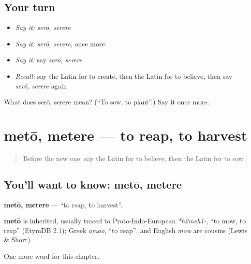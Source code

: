 \subsection*{Your turn}
\begin{itemize}
\raggedright
  \item \emph{Say it:} \emph{serō, serere}
  \item \emph{Say it:} \emph{serō, serere}, once more
  \item \emph{Say it:} say \emph{serō, serere}
  \item \emph{Recall:} say the Latin for to create, then the Latin for to believe, then say \emph{serō, serere} again
\end{itemize}

\begin{tcolorbox}[breakable,colback=teal!4,colframe=teal!35!black,title={Before you move on}]
What does serō, serere mean? (\textquotedblleft{}To sow, to plant\textquotedblright{}.) Say it once more.
\end{tcolorbox}
\section[metō, metere]{metō, metere — to reap, to harvest}

\label{lesson:LA-C172-meto}



\begin{quote}
Before the new one: say the Latin for to believe, then the Latin for to sow.
\end{quote}

\subsection*{You'll want to know: metō, metere}
\textbf{metō, metere} — \textquotedblleft{}to reap, to harvest\textquotedblright{}.

\begin{cousinweb}
\textbf{metō} is inherited, usually traced to Proto-Indo-European \emph{*h2meh1-}, \textquotedblleft{}to mow, to reap\textquotedblright{} (EtymDB 2.1); Greek \emph{amaō}, \textquotedblleft{}to reap\textquotedblright{}, and English \emph{mow} are cousins (Lewis \& Short).
\end{cousinweb}

\begin{grammarlens}[title={What you've built}]
One more word for this chapter.
\end{grammarlens}

